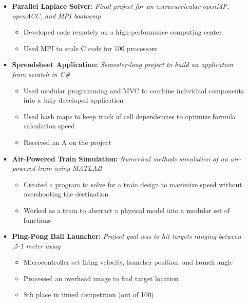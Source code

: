\documentclass{article}
\begin{document}
\begin{itemize}
    \item \textbf{Parallel Laplace Solver:} \textit{Final project for an extracurricular openMP, openACC, and MPI bootcamp}
    \begin{itemize}
        \item Developed code remotely on a high-performance computing center
        \item Used MPI to scale C code for 100 processors
    \end{itemize}
    \vspace{4mm}
    \item \textbf{Spreadsheet Application:}
    \textit{Semester-long project to build an application from scratch in C\#}
    \begin{itemize}
        \item Used modular programming and MVC to combine individual components into a fully developed application
        \item Used hash maps to keep track of cell dependencies to optimize formula calculation speed
        \item Received an A on the project
    \end{itemize}
    \vspace{4mm}
    \item \textbf{Air-Powered Train Simulation:}
         \textit{Numerical methods simulation of an air-powered train using MATLAB}
         \begin{itemize}
             \item Created a program to solve for a train design to maximize speed without overshooting the destination
             \item Worked as a team to abstract a physical model into a modular set of functions
         \end{itemize}
         \vspace{4mm}
    \item \textbf{Ping-Pong Ball Launcher:}
        \textit{Project goal was to hit targets ranging between .5-1 meter away}
        \begin{itemize}
            \item Microcontroller set firing velocity, launcher position, and launch angle
            \item Processed an overhead image to find target location
            \item 8th place in timed competition (out of 100)
        \end{itemize}
\end{itemize}
\end{document}
